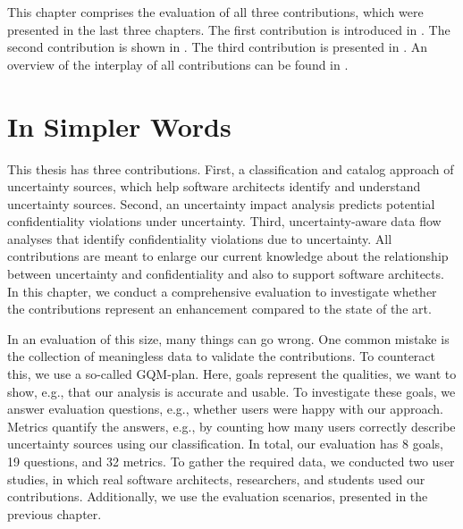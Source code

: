 
This chapter comprises the evaluation of all three contributions, which were presented in the last three chapters. 
The first contribution is introduced in .
The second contribution is shown in .
The third contribution is presented in .
An overview of the interplay of all contributions can be found in .





\section{In Simpler Words}%
\label{sec:evaluation:simple}

This thesis has three contributions.
First, a classification and catalog approach of uncertainty sources, which help software architects identify and understand uncertainty sources.
Second, an uncertainty impact analysis predicts potential confidentiality violations under uncertainty.
Third, uncertainty-aware data flow analyses that identify confidentiality violations due to uncertainty.
All contributions are meant to enlarge our current knowledge about the relationship between uncertainty and confidentiality and also to support software architects.
In this chapter, we conduct a comprehensive evaluation to investigate whether the contributions represent an enhancement compared to the state of the art.

In an evaluation of this size, many things can go wrong.
One common mistake is the collection of meaningless data to validate the contributions.
To counteract this, we use a so-called \acf{GQM}-plan.
Here, goals represent the qualities, we want to show, e.g., that our analysis is accurate and usable.
To investigate these goals, we answer evaluation questions, e.g., whether users were happy with our approach.
Metrics quantify the answers, e.g., by counting how many users correctly describe uncertainty sources using our classification.
In total, our evaluation has 8 goals, 19 questions, and 32 metrics.
To gather the required data, we conducted two user studies, in which real software architects, researchers, and students used our contributions.
Additionally, we use the evaluation scenarios, presented in the previous chapter.

